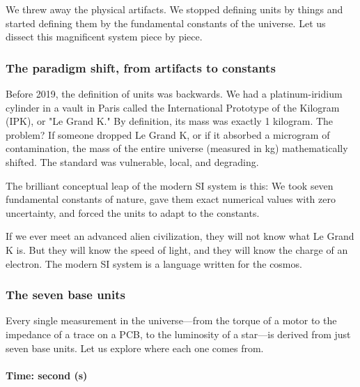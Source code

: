 \documentclass[../main.tex]{subfiles}
\begin{document}
We threw away the physical artifacts. We stopped defining units by things and started defining them by the fundamental constants of the universe. Let us dissect this magnificent system piece by piece.

\subsubsection{The paradigm shift, from artifacts to constants}

Before 2019, the definition of units was backwards. We had a platinum-iridium cylinder in a vault in Paris called the International Prototype of the Kilogram (IPK), or "Le Grand K." By definition, its mass was exactly 1 kilogram. The problem? If someone dropped Le Grand K, or if it absorbed a microgram of contamination, the mass of the entire universe (measured in kg) mathematically shifted. The standard was vulnerable, local, and degrading.

The brilliant conceptual leap of the modern SI system is this: We took seven fundamental constants of nature, gave them exact numerical values with zero uncertainty, and forced the units to adapt to the constants.

If we ever meet an advanced alien civilization, they will not know what Le Grand K is. But they will know the speed of light, and they will know the charge of an electron. The modern SI system is a language written for the cosmos.

\subsubsection{The seven base units}

Every single measurement in the universe—from the torque of a motor to the impedance of a trace on a PCB, to the luminosity of a star—is derived from just seven base units. Let us explore where each one comes from.

\paragraph{Time: second (s)}
\end{document}
